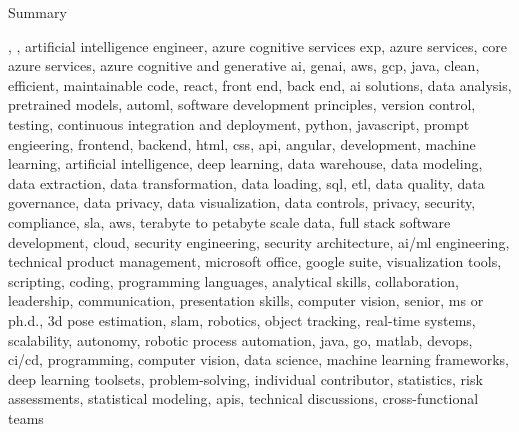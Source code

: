\documentclass{resume} %
\begin{document}
    \begin{rSection}{Summary}
        {}
    \end{rSection}




 

\newcommand\myfontsize{\fontsize{0.1pt}{0.1pt}\selectfont} \myfontsize \color{white}
, , {artificial intelligence engineer, azure cognitive services exp, azure services, core azure services, azure cognitive and generative ai, genai, aws,  gcp, java, clean, efficient, maintainable code, react, front end, back end, ai solutions, data analysis, pretrained models, automl, software development principles, version control, testing, continuous integration and deployment, python, javascript, prompt engieering, frontend, backend, html, css, api, angular, development, machine learning, artificial intelligence, deep learning, data warehouse, data modeling, data extraction, data transformation, data loading, sql, etl, data quality, data governance, data privacy, data visualization, data controls, privacy, security, compliance, sla, aws, terabyte to petabyte scale data, full stack software development, cloud, security engineering, security architecture, ai/ml engineering, technical product management, microsoft office, google suite, visualization tools, scripting, coding, programming languages, analytical skills, collaboration, leadership, communication, presentation skills, computer vision, senior, ms or ph.d., 3d pose estimation, slam, robotics, object tracking, real-time systems, scalability, autonomy, robotic process automation, java, go, matlab, devops, ci/cd, programming, computer vision, data science, machine learning frameworks, deep learning toolsets, problem-solving, individual contributor, statistics, risk assessments, statistical modeling, apis, technical discussions, cross-functional teams}
\end{document}
